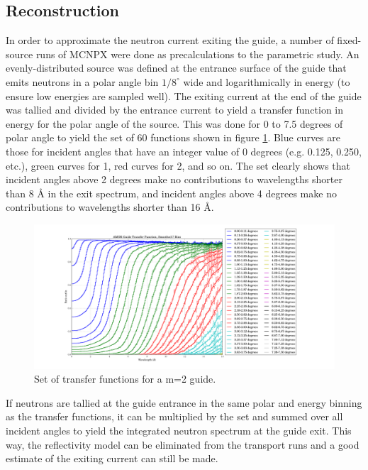 \documentclass[a4paper]{jpconf}
\begin{document}
\subsection{Reconstruction}

In order to approximate the neutron current exiting the guide, a number of fixed-source runs of MCNPX were done as precalculations to the parametric study.  An evenly-distributed source was defined at the entrance surface of the guide that emits neutrons in a polar angle bin $1/8^\circ$ wide and logarithmically in energy (to ensure low energies are sampled well).  The exiting current at the end of the guide was tallied and divided by the entrance current to yield a transfer function in energy for the polar angle of the source.  This was done for 0 to 7.5 degrees of polar angle to yield the set of 60 functions shown in figure \ref{xfer_func}.  Blue curves are those for incident angles that have an integer value of 0 degrees (e.g. 0.125, 0.250, etc.), green curves for 1, red curves for 2, and so on.  The set clearly shows that incident angles above 2 degrees make no contributions to wavelengths shorter than 8 \AA{} in the exit spectrum, and incident angles above 4 degrees make no contributions to wavelengths shorter than 16 \AA{}. 

\begin{figure}
\begin{center}
\includegraphics[scale=0.3,trim={2cm 1.7cm 1.8cm 0.8cm},clip]{graphics/xfer_func.pdf}
\end{center}
\caption{\label{xfer_func}Set of transfer functions for a m=2 guide.}
\end{figure}

If neutrons are tallied at the guide entrance in the same polar and energy binning as the transfer functions, it can be multiplied by the set and summed over all incident angles to yield the integrated neutron spectrum at the guide exit.  This way, the reflectivity model can be eliminated from the transport runs and a good estimate of the exiting current can still be made.
\end{document}

